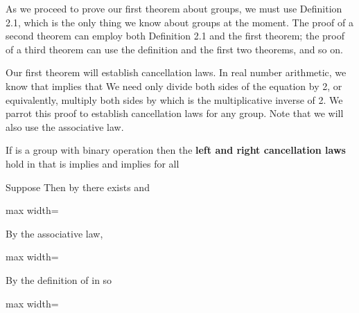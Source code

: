 \documentclass[11pt,oneside]{article}
\begin{document}
\begin{BookBody}

\noindent As we proceed to prove our first theorem about groups, we must use Definition 2.1, which is the only thing we know about groups at the moment. The proof of a second theorem can employ both Definition 2.1 and the first theorem; the proof of a third theorem can use the definition and the first two theorems, and so on.

Our first theorem will establish cancellation laws. In real number arithmetic, we know that  implies that  We need only divide both sides of the equation  by 2, or equivalently, multiply both sides by  which is the multiplicative inverse of 2. We parrot this proof to establish cancellation laws for any group. Note that we will also use the associative law.

 If  is a group with binary operation \BookInline{\ast,\allowbreak } then the\textbf{ left and right cancellation laws} hold in  that is implies  and  implies  for all 

 Suppose  Then by  there exists  and

\begin{center}\begin{adjustbox}{max width=\linewidth}\end{adjustbox}\end{center}

\noindent By the associative law,

\begin{center}\begin{adjustbox}{max width=\linewidth}\end{adjustbox}\end{center}

\noindent By the definition of  in  so

\begin{center}\begin{adjustbox}{max width=\linewidth}\end{adjustbox}\end{center}

\end{BookBody}
\end{document}
